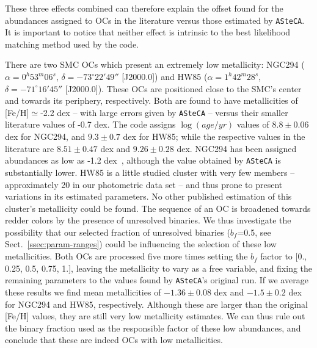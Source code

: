 \documentclass{aa}
\begin{document}
\noindent These three effects combined can therefore explain the offset found
for the abundances assigned to OCs in the literature versus those estimated by
\texttt{ASteCA}. It is important to notice that neither effect is intrinsic to
the best likelihood matching method used by the code.

%
There are two SMC OCs which present an extremely low metallicity: NGC294
($\alpha{=}0^h53^m06^s$, $\delta{=}-73^\circ22'49''$ [J2000.0]) and
HW85 ($\alpha{=}1^h42^m28^s$, $\delta{=}-71^\circ16'45''$ [J2000.0]). These
OCs are positioned close to the SMC's center and towards its periphery,
respectively.
Both are found to have metallicities of [Fe/H]$\simeq$-2.2 dex -- with large
errors given by \texttt{ASteCA} -- versus their smaller literature values of
-0.7 dex.
The code assigns $\log(age/yr)$ values of $8.8{\pm}0.06$ dex for NGC294, and
$9.3{\pm}0.7$ dex for HW85; while the respective values in the literature are
$8.51{\pm}0.47$ dex and $9.26{\pm}0.28$ dex.
%
NGC294 has been assigned abundances as low as -1.2 dex~\citep[see the
integrated spectroscopy study by][]{Dias_2010}, although the value obtained by
\texttt{ASteCA} is substantially lower. HW85 is a little studied cluster with
very few members -- approximately 20 in our photometric data set -- and thus
prone to present variations in its estimated parameters. No other
published estimation of this cluster's metallicity could be found.
%
The sequence of an OC is broadened towards redder colors by the
presence of unresolved binaries. We thus investigate the possibility that our
selected fraction of unresolved binaries ($b_f$=0.5, see
Sect.~\ref{ssec:param-ranges}) could be influencing the selection of these low
metallicities. Both OCs are processed five more times setting the $b_f$
factor to [0., 0.25, 0.5, 0.75, 1.], leaving the metallicity to vary as a free
variable, and fixing the remaining parameters to the values found by
\texttt{ASteCA}'s original run.
If we average these results we find mean metallicities of  $-1.36{\pm}0.08$ dex
and $-1.5{\pm}0.2$ dex for NGC294 and HW85, respectively.
Although these are larger than the original [Fe/H] values, they are still
very low metallicity estimates. We can thus rule out the binary fraction used as
the responsible factor of these low abundances, and conclude that these are
indeed OCs with low metallicities.
\end{document}
